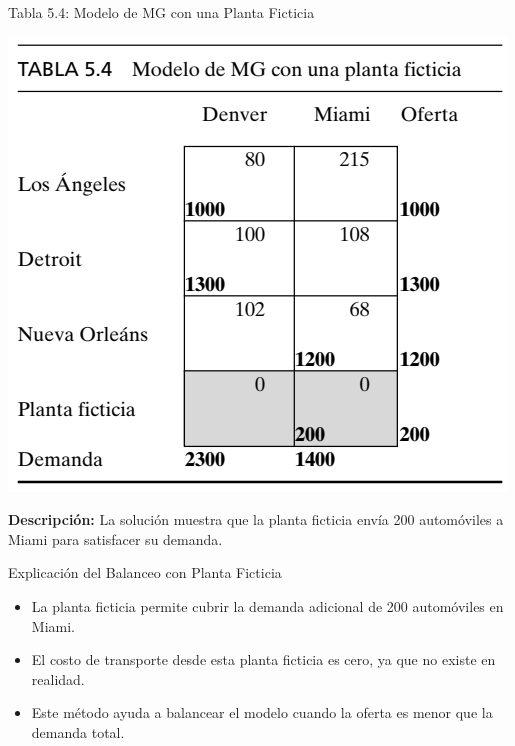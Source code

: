 \documentclass{beamer}
\begin{document}
\begin{frame}{Tabla 5.4: Modelo de MG con una Planta Ficticia}
\begin{center}
    \includegraphics[scale=1]{images/transporte01.png}
\end{center}
    \vspace{0.3cm}
    \textbf{Descripción:} La solución muestra que la planta ficticia envía 200 automóviles a Miami para satisfacer su demanda.
\end{frame}

\begin{frame}{Explicación del Balanceo con Planta Ficticia}
    \begin{itemize}
        \item La planta ficticia permite cubrir la demanda adicional de 200 automóviles en Miami.
        \item El costo de transporte desde esta planta ficticia es cero, ya que no existe en realidad.
        \item Este método ayuda a balancear el modelo cuando la oferta es menor que la demanda total.
    \end{itemize}
\end{frame}
\end{document}

